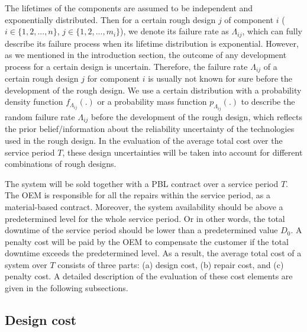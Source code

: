 \documentclass[10pt,a4paper]{article}
\begin{document}
The lifetimes of the components are assumed to be independent and exponentially distributed. Then for a certain rough design $j$ of component $i$ ($i \in \{1,2,...,n\}$, $j \in \{1,2,...,m_i\}$), we denote its failure rate as $\Lambda_{ij}$, which can fully describe its failure process when its lifetime distribution is exponential. However, as we mentioned in the introduction section, the outcome of any development process for a certain design is uncertain. Therefore, the failure rate $\Lambda_{ij}$ of a certain rough design $j$ for component $i$ is usually not known for sure before the development of the rough design. We use a certain distribution with a probability density function $f_{\Lambda_{ij}}(.)$ or a probability mass function $p_{\Lambda_{ij}}(.)$ to describe the random failure rate $\Lambda_{ij}$ before the development of the rough design, which reflects the prior belief/information about the reliability uncertainty of the technologies used in the rough design. In the evaluation of the average total cost over the service period $T$, these design uncertainties will be taken into account for different combinations of rough designs.

The system will be sold together with a PBL contract over a service period $T$. The OEM is responsible for all the repairs within the service period, as a material-based contract. Moreover, the system availability should be above a predetermined level for the whole service period. Or in other words, the total downtime of the service period should be lower than a predetermined value $D_0$. A penalty cost will be paid by the OEM to compensate the customer if the total downtime exceeds the predetermined level. As a result, the average total cost of a system over $T$ consists of three parts: (a) design cost, (b) repair cost, and (c) penalty cost. A detailed description of the evaluation of these cost elements are given in the following subsections.



\subsection{Design cost}
	
\end{document}
